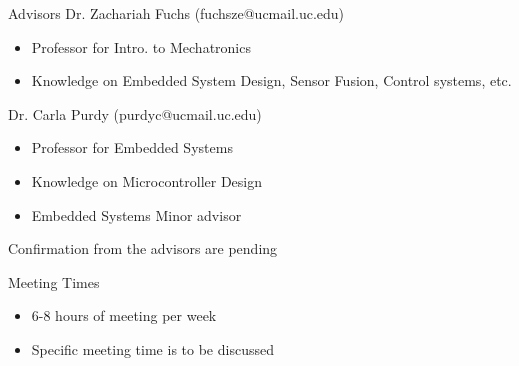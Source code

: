 \documentclass{beamer}
\begin{document}
\begin{frame}{Advisors}
	Dr. Zachariah Fuchs (fuchsze@ucmail.uc.edu)
	\begin{itemize}
		\item Professor for Intro. to Mechatronics
		\item Knowledge on Embedded System Design, Sensor Fusion, Control systems, etc.
	\end{itemize}
	Dr. Carla Purdy (purdyc@ucmail.uc.edu)
	\begin{itemize}
		\item Professor for Embedded Systems
		\item Knowledge on Microcontroller Design
		\item Embedded Systems Minor advisor
	\end{itemize}
	Confirmation from the advisors are pending
\end{frame}

\begin{frame}{Meeting Times}
	\begin{itemize}
		\item 6-8 hours of meeting per week
		\item Specific meeting time is to be discussed
	\end{itemize}
\end{frame}
\end{document}
